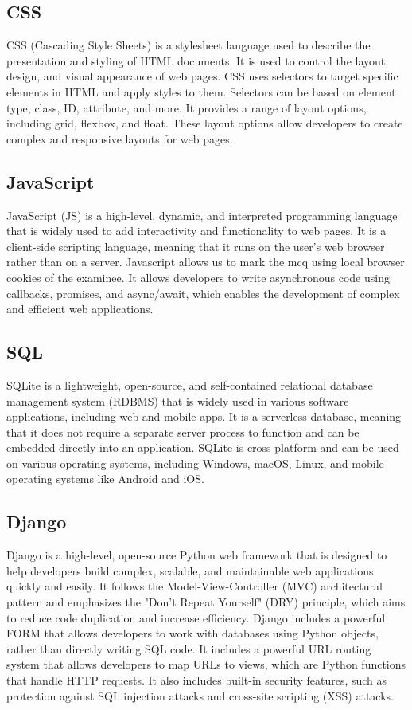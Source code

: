 \subsection{CSS} 
CSS (Cascading Style Sheets) is a stylesheet language used to describe the presentation and styling of HTML documents. It is used to control the layout, design, and visual appearance of web pages. CSS uses selectors to target specific elements in HTML and apply styles to them. Selectors can be based on element type, class, ID, attribute, and more. It provides a range of layout options, including grid, flexbox, and float. These layout options allow developers to create complex and responsive layouts for web pages. 

\subsection{JavaScript}
JavaScript (JS) is a high-level, dynamic, and interpreted programming language that is widely used to add interactivity and functionality to web pages. It is a client-side scripting language, meaning that it runs on the user's web browser rather than on a server. Javascript allows us to mark the mcq using local browser cookies of the examinee. It allows developers to write asynchronous code using callbacks, promises, and async/await, which enables the development of complex and efficient web applications.

\subsection{SQL} 
SQLite is a lightweight, open-source, and self-contained relational database management system (RDBMS) that is widely used in various software applications, including web and mobile apps. It is a serverless database, meaning that it does not require a separate server process to function and can be embedded directly into an application. SQLite is cross-platform and can be used on various operating systems, including Windows, macOS, Linux, and mobile operating systems like Android and iOS. 

\subsection{Django}
Django is a high-level, open-source Python web framework that is designed to help developers build complex, scalable, and maintainable web applications quickly and easily. It follows the Model-View-Controller (MVC) architectural pattern and emphasizes the "Don't Repeat Yourself" (DRY) principle, which aims to reduce code duplication and increase efficiency.
Django includes a powerful FORM that allows developers to work with databases using Python objects, rather than directly writing SQL code. It includes a powerful URL routing system that allows developers to map URLs to views, which are Python functions that handle HTTP requests. It also includes built-in security features, such as protection against SQL injection attacks and cross-site scripting (XSS) attacks.




